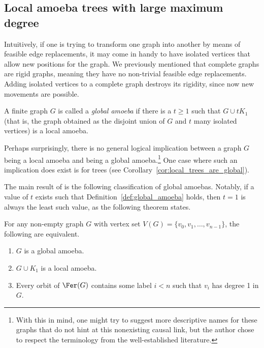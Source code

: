 
\subsection{Local amoeba trees with large maximum degree}\label{subsec:new_recursive}

Intuitively, if one is trying to transform one graph into another by means of feasible edge replacements, it may come in handy to have isolated vertices that allow new positions for the graph.
We previously mentioned that complete graphs are rigid graphs, meaning they have no non-trivial feasible edge replacements.
Adding isolated vertices to a complete graph destroys its rigidity, since now new movements are possible.

\begin{definition}\label{def:global_amoeba}
    A finite graph $G$ is called a \emph{global amoeba} if there is a $t\geq1$ such that $G\cup tK_1$ (that is, the graph obtained as the disjoint union of $G$ and $t$ many isolated vertices) is a local amoeba.
\end{definition}

Perhaps surprisingly, there is no general logical implication between a graph $G$ being a local amoeba and being a global amoeba.\footnote{With this in mind, one might try to suggest more descriptive names for these graphs that do not hint at this nonexisting causal link, but the author chose to respect the terminology from the well-established literature.}
One case where such an implication does exist is for trees (see Corollary~\ref{cor:local_trees_are_global}).

The main result of \cite{Caroetal2023} is the following classification of global amoebas.
Notably, if a value of $t$ exists such that Definition~\ref{def:global_amoeba} holds, then $t=1$ is always the least such value, as the following theorem states.

\begin{theorem}\label{thm:classification_global}
    For any non-empty graph $G$ with vertex set $V(G)=\{v_0,v_1,\dots,v_{n-1}\}$, the following are equivalent.
    
    \begin{enumerate}
        \item $G$ is a global amoeba.
        
        \item $G\cup K_1$ is a local amoeba.
        
        \item Every orbit of $\Fer(G)$ contains some label $i<n$ such that $v_i$ has degree 1 in $G$.
    \end{enumerate}
\end{theorem}

